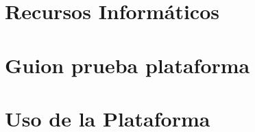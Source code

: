 \begin{appendices}

\chapter{Recursos Informáticos}

\chapter{Guion prueba plataforma}

\chapter{Uso de la Plataforma}

\end{appendices}